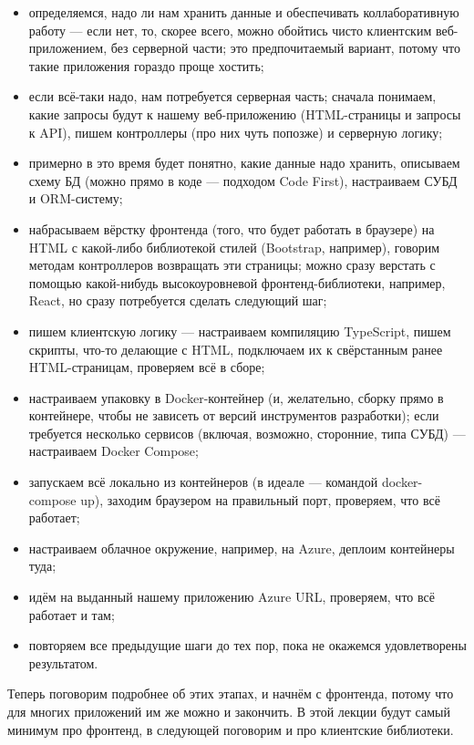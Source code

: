 \documentclass[a5paper]{article}
\begin{document}
\begin{itemize}
    \item определяемся, надо ли нам хранить данные и обеспечивать коллаборативную работу --- если нет, то, скорее всего, можно обойтись чисто клиентским веб-приложением, без серверной части; это предпочитаемый вариант, потому что такие приложения гораздо проще хостить;
    \item если всё-таки надо, нам потребуется серверная часть; сначала понимаем, какие запросы будут к нашему веб-приложению (HTML-страницы и запросы к API), пишем контроллеры (про них чуть попозже) и серверную логику;
    \item примерно в это время будет понятно, какие данные надо хранить, описываем схему БД (можно прямо в коде --- подходом Code First), настраиваем СУБД и ORM-систему;
    \item набрасываем вёрстку фронтенда (того, что будет работать в браузере) на HTML с какой-либо библиотекой стилей (Bootstrap, например), говорим методам контроллеров возвращать эти страницы; можно сразу верстать с помощью какой-нибудь высокоуровневой фронтенд-библиотеки, например, React, но сразу потребуется сделать следующий шаг;
    \item пишем клиентскую логику --- настраиваем компиляцию TypeScript, пишем скрипты, что-то делающие с HTML, подключаем их к свёрстанным ранее HTML-страницам, проверяем всё в сборе;
    \item настраиваем упаковку в Docker-контейнер (и, желательно, сборку прямо в контейнере, чтобы не зависеть от версий инструментов разработки); если требуется несколько сервисов (включая, возможно, сторонние, типа СУБД) --- настраиваем Docker Compose;
    \item запускаем всё локально из контейнеров (в идеале --- командой docker-compose up), заходим браузером на правильный порт, проверяем, что всё работает;
    \item настраиваем облачное окружение, например, на Azure, деплоим контейнеры туда;
    \item идём на выданный нашему приложению Azure URL, проверяем, что всё работает и там;
    \item повторяем все предыдущие шаги до тех пор, пока не окажемся удовлетворены результатом.
\end{itemize}

Теперь поговорим подробнее об этих этапах, и начнём с фронтенда, потому что для многих приложений им же можно и закончить. В этой лекции будут самый минимум про фронтенд, в следующей поговорим и про клиентские библиотеки.
\end{document}
